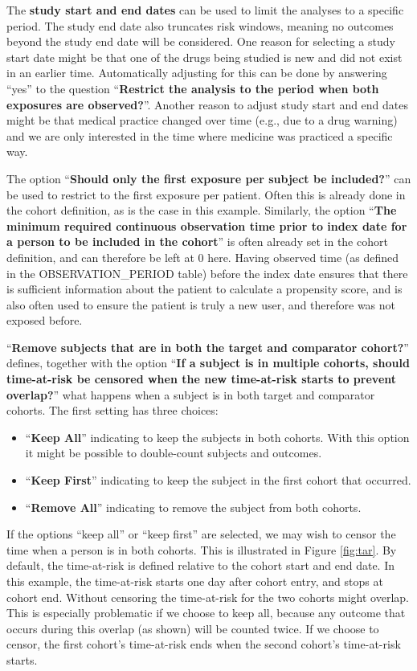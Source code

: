 \documentclass[]{book}
\providecommand{\tightlist}{%
  \setlength{\itemsep}{0pt}\setlength{\parskip}{0pt}}
\begin{document}
The \textbf{study start and end dates} can be used to limit the analyses to a specific period. The study end date also truncates risk windows, meaning no outcomes beyond the study end date will be considered. One reason for selecting a study start date might be that one of the drugs being studied is new and did not exist in an earlier time. Automatically adjusting for this can be done by answering ``yes'' to the question ``\textbf{Restrict the analysis to the period when both exposures are observed?}''. Another reason to adjust study start and end dates might be that medical practice changed over time (e.g., due to a drug warning) and we are only interested in the time where medicine was practiced a specific way.

The option ``\textbf{Should only the first exposure per subject be included?}'' can be used to restrict to the first exposure per patient. Often this is already done in the cohort definition, as is the case in this example. Similarly, the option ``\textbf{The minimum required continuous observation time prior to index date for a person to be included in the cohort}'' is often already set in the cohort definition, and can therefore be left at 0 here. Having observed time (as defined in the OBSERVATION\_PERIOD table) before the index date ensures that there is sufficient information about the patient to calculate a propensity score, and is also often used to ensure the patient is truly a new user, and therefore was not exposed before.

``\textbf{Remove subjects that are in both the target and comparator cohort?}'' defines, together with the option ``\textbf{If a subject is in multiple cohorts, should time-at-risk be censored when the new time-at-risk starts to prevent overlap?}'' what happens when a subject is in both target and comparator cohorts. The first setting has three choices:

\begin{itemize}
\tightlist
\item
  ``\textbf{Keep All}'' indicating to keep the subjects in both cohorts. With this option it might be possible to double-count subjects and outcomes.
\item
  ``\textbf{Keep First}'' indicating to keep the subject in the first cohort that occurred.
\item
  ``\textbf{Remove All}'' indicating to remove the subject from both cohorts.
\end{itemize}

If the options ``keep all'' or ``keep first'' are selected, we may wish to censor the time when a person is in both cohorts. This is illustrated in Figure \ref{fig:tar}. By default, the time-at-risk is defined relative to the cohort start and end date. In this example, the time-at-risk starts one day after cohort entry, and stops at cohort end. Without censoring the time-at-risk for the two cohorts might overlap. This is especially problematic if we choose to keep all, because any outcome that occurs during this overlap (as shown) will be counted twice. If we choose to censor, the first cohort's time-at-risk ends when the second cohort's time-at-risk starts.
\end{document}
